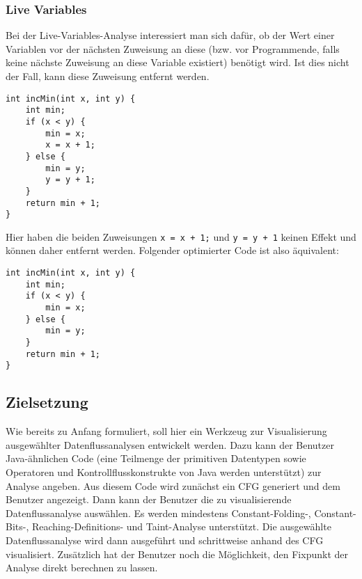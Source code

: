 \subsubsection{Live Variables}
Bei der Live-Variables-Analyse interessiert man sich dafür, ob der Wert einer Variablen vor der nächsten Zuweisung an diese (bzw. vor Programmende, falls keine nächste Zuweisung an diese Variable existiert) benötigt wird. 
Ist dies nicht der Fall, kann diese Zuweisung entfernt werden.

\par

\begin{lstlisting}[frame=single, captionpos=b, caption=Beispielcode für Live-Variables-Analyse]
int incMin(int x, int y) {
	int min;
	if (x < y) {
		min = x;
		x = x + 1;
	} else {
		min = y;
		y = y + 1;
	}
	return min + 1;
}
\end{lstlisting}

\par

Hier haben die beiden Zuweisungen \lstinline{x = x + 1;} und \lstinline{y = y + 1} keinen Effekt und können daher entfernt werden.
Folgender optimierter Code ist also äquivalent:

\par

\begin{lstlisting}[frame=single, captionpos=b, caption=Mittels Live-Variables-Analyse optimierte Version von Listing 7]
int incMin(int x, int y) {
	int min;
	if (x < y) {
		min = x;
	} else {
		min = y;
	}
	return min + 1;
}
\end{lstlisting}

\subsection{Zielsetzung}
Wie bereits zu Anfang formuliert, soll hier ein Werkzeug zur Visualisierung ausgewählter Datenflussanalysen entwickelt werden.
Dazu kann der Benutzer Java-ähnlichen Code (eine Teilmenge der primitiven Datentypen sowie Operatoren und Kontrollflusskonstrukte von Java werden unterstützt) zur Analyse angeben.
Aus diesem Code wird zunächst ein CFG generiert und dem Benutzer angezeigt.
Dann kann der Benutzer die zu visualisierende Datenflussanalyse auswählen.
Es werden mindestens Constant-Folding-, Constant-Bits-, Reaching-Definitions- und Taint-Analyse unterstützt.
Die ausgewählte Datenflussanalyse wird dann ausgeführt und schrittweise anhand des CFG visualisiert.
Zusätzlich hat der Benutzer noch die Möglichkeit, den Fixpunkt der Analyse direkt berechnen zu lassen.
